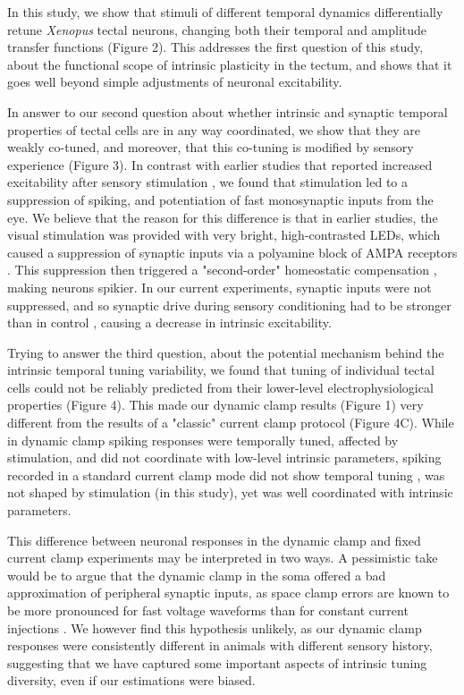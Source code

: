 \documentclass{article}
\begin{document}
In this study, we show that stimuli of different temporal dynamics differentially retune \textit{Xenopus} tectal neurons, changing both their temporal and amplitude transfer functions (Figure 2). This addresses the first question of this study, about the functional scope of intrinsic plasticity in the tectum, and shows that it goes well beyond simple adjustments of neuronal excitability.

In answer to our second question about whether intrinsic and synaptic temporal properties of tectal cells are in any way coordinated, we show that they are weakly co-tuned, and moreover, that this co-tuning is modified by sensory experience (Figure 3). In contrast with earlier studies that reported increased excitability after sensory stimulation \citep{aizenman2003, dong2009, ciarleglio2015}, we found that stimulation led to a suppression of spiking, and potentiation of fast monosynaptic inputs from the eye. We believe that the reason for this difference is that in earlier studies, the visual stimulation was provided with very bright, high-contrasted LEDs, which caused a suppression of synaptic inputs via a polyamine block of AMPA receptors \citep{aizenman2003}. This suppression then triggered a "second-order" homeostatic compensation \citep{turrigiano2011, tien2018}, making neurons spikier. In our current experiments, synaptic inputs were not suppressed, and so synaptic drive during sensory conditioning had to be stronger than in control \citep{khakhalin2014}, causing a decrease in intrinsic excitability.

Trying to answer the third question, about the potential mechanism behind the intrinsic temporal tuning variability, we found that tuning of individual tectal cells could not be reliably predicted from their lower-level electrophysiological properties (Figure 4). This made our dynamic clamp results (Figure 1) very different from the results of a "classic" current clamp protocol (Figure 4C). While in dynamic clamp spiking responses were temporally tuned, affected by stimulation, and did not coordinate with low-level intrinsic parameters, spiking recorded in a standard current clamp mode did not show temporal tuning \citep{ciarleglio2015}, was not shaped by stimulation (in this study), yet was well coordinated with intrinsic parameters. 

This difference between neuronal responses in the dynamic clamp and fixed current clamp experiments may be interpreted in two ways. A pessimistic take would be to argue that the dynamic clamp in the soma offered a bad approximation of peripheral synaptic inputs, as space clamp errors are known to be more pronounced for fast voltage waveforms than for constant current injections \citep{spruston1993, prinz2004}. We however find this hypothesis unlikely, as our dynamic clamp responses were consistently different in animals with different sensory history, suggesting that we have captured some important aspects of intrinsic tuning diversity, even if our estimations were biased. 
\end{document}
